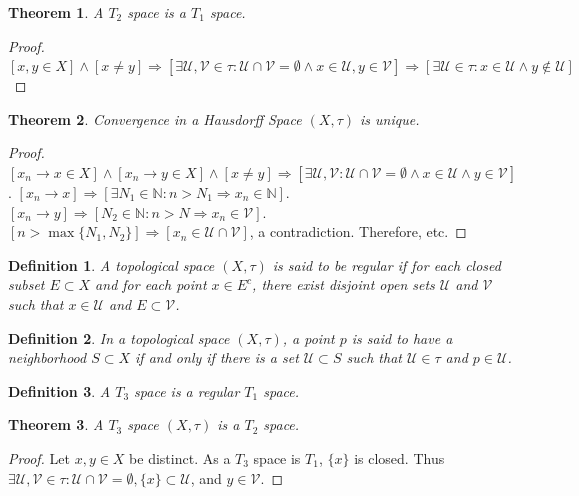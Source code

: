 \documentclass[oneside]{book}
\theoremstyle{mystyle}
\newtheorem{theorem}{Theorem}[section]
\newtheorem{definition}{Definition}[section]
\begin{document}
\begin{theorem}
A $T_2$ space is a $T_1$ space.
\end{theorem}
\begin{proof}
$[x,y\in X]\land [x\ne y]\Rightarrow [\exists \mathcal{U},\mathcal{V}\in \tau:\mathcal{U}\cap \mathcal{V}=\emptyset\land x\in \mathcal{U},y\in \mathcal{V}]\Rightarrow [\exists \mathcal{U}\in \tau:x\in \mathcal{U}\land y\notin \mathcal{U}]$
\end{proof}

\begin{theorem}
Convergence in a Hausdorff Space $(X,\tau)$ is unique.
\end{theorem}
\begin{proof}
$[x_n \rightarrow x\in X]\land [x_n \rightarrow y\in X]\land[x\ne y]\Rightarrow [\exists \mathcal{U},\mathcal{V}:\mathcal{U}\cap \mathcal{V}=\emptyset\land x\in \mathcal{U}\land y\in \mathcal{V}]$. $[x_n\rightarrow x]\Rightarrow [\exists N_1\in \mathbb{N}:n>N_1\Rightarrow x_n \in \mathbb{N}]$. $[x_n\rightarrow y]\Rightarrow [N_2\in \mathbb{N}:n>N\Rightarrow x_n \in \mathcal{V}]$. $[n>\max\{N_1,N_2\}]\Rightarrow [x_n \in \mathcal{U}\cap \mathcal{V}]$, a contradiction. Therefore, etc.
\end{proof}

\begin{definition}
A topological space $(X,\tau)$ is said to be regular if for each closed subset $E\subset X$ and for each point $x\in E^c$, there exist disjoint open sets $\mathcal{U}$ and $\mathcal{V}$ such that $x\in \mathcal{U}$ and $E\subset \mathcal{V}$.
\end{definition} 

\begin{definition}
In a topological space $(X,\tau)$, a point $p$ is said to have a neighborhood $S\subset X$ if and only if there is a set $\mathcal{U}\subset S$ such that $\mathcal{U}\in \tau$ and $p\in \mathcal{U}$.
\end{definition}

\begin{definition}
A $T_3$ space is a regular $T_1$ space.
\end{definition}

\begin{theorem}
A $T_3$ space $(X,\tau)$ is a $T_2$ space.
\end{theorem}
\begin{proof}
Let $x,y\in X$ be distinct. As a $T_3$ space is $T_1$, $\{x\}$ is closed. Thus $\exists \mathcal{U},\mathcal{V}\in\tau: \mathcal{U}\cap\mathcal{V}=\emptyset, \{x\}\subset \mathcal{U}$, and $y\in \mathcal{V}$.
\end{proof}
\end{document}
